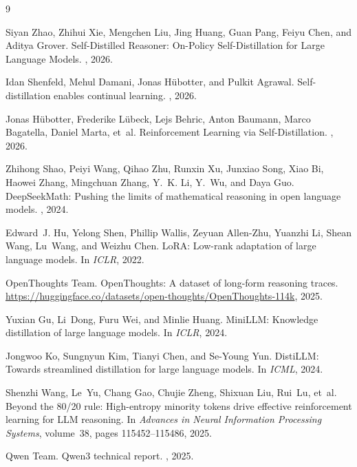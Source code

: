 \documentclass{article}
\begin{document}

\begin{thebibliography}{9}

Siyan Zhao, Zhihui Xie, Mengchen Liu, Jing Huang, Guan Pang, Feiyu Chen, and Aditya Grover.
\newblock Self-Distilled Reasoner: On-Policy Self-Distillation for Large Language Models.
, 2026.

Idan Shenfeld, Mehul Damani, Jonas H\"{u}botter, and Pulkit Agrawal.
\newblock Self-distillation enables continual learning.
, 2026.

Jonas H\"{u}botter, Frederike L\"{u}beck, Lejs Behric, Anton Baumann, Marco Bagatella, Daniel Marta, et~al.
\newblock Reinforcement Learning via Self-Distillation.
, 2026.

Zhihong Shao, Peiyi Wang, Qihao Zhu, Runxin Xu, Junxiao Song, Xiao Bi, Haowei Zhang, Mingchuan Zhang, Y.~K. Li, Y.~Wu, and Daya Guo.
\newblock DeepSeekMath: Pushing the limits of mathematical reasoning in open language models.
, 2024.

Edward~J. Hu, Yelong Shen, Phillip Wallis, Zeyuan Allen-Zhu, Yuanzhi Li, Shean Wang, Lu~Wang, and Weizhu Chen.
\newblock LoRA: Low-rank adaptation of large language models.
\newblock In {\em ICLR}, 2022.

OpenThoughts Team.
\newblock OpenThoughts: A dataset of long-form reasoning traces.
\newblock \url{https://huggingface.co/datasets/open-thoughts/OpenThoughts-114k}, 2025.

Yuxian Gu, Li~Dong, Furu Wei, and Minlie Huang.
\newblock MiniLLM: Knowledge distillation of large language models.
\newblock In {\em ICLR}, 2024.

Jongwoo Ko, Sungnyun Kim, Tianyi Chen, and Se-Young Yun.
\newblock DistiLLM: Towards streamlined distillation for large language models.
\newblock In {\em ICML}, 2024.

Shenzhi Wang, Le~Yu, Chang Gao, Chujie Zheng, Shixuan Liu, Rui~Lu, et~al.
\newblock Beyond the 80/20 rule: High-entropy minority tokens drive effective reinforcement learning for LLM reasoning.
\newblock In {\em Advances in Neural Information Processing Systems}, volume~38, pages 115452--115486, 2025.

Qwen Team.
\newblock Qwen3 technical report.
, 2025.

\end{thebibliography}
\end{document}
